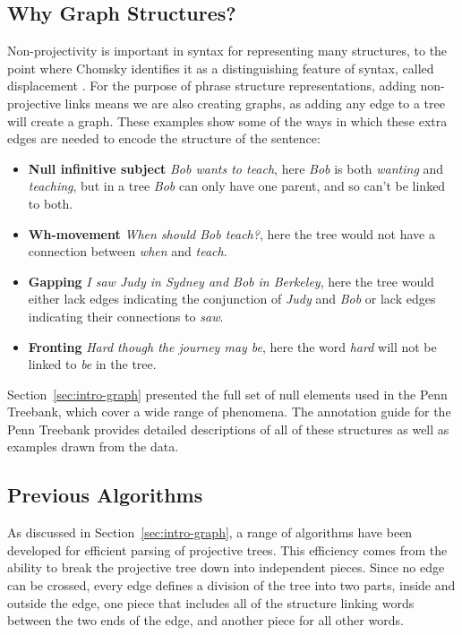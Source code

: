\subsection{Why Graph Structures?}

Non-projectivity is important in syntax for representing many structures, to the point where Chomsky identifies it as a distinguishing feature of syntax, called displacement \parencite{displacement}.
For the purpose of phrase structure representations, adding non-projective links means we are also creating graphs, as adding any edge to a tree will create a graph.
These examples show some of the ways in which these extra edges are needed to encode the structure of the sentence:

\begin{itemize}
  \item \textbf{Null infinitive subject} \emph{Bob wants to teach}, here \emph{Bob} is both \emph{wanting} and \emph{teaching}, but in a tree \emph{Bob} can only have one parent, and so can't be linked to both.
  \item \textbf{Wh-movement} \emph{When should Bob teach?}, here the tree would not have a connection between \emph{when} and \emph{teach}.
  \item \textbf{Gapping} \emph{I saw Judy in Sydney and Bob in Berkeley}, here the tree would either lack edges indicating the conjunction of \emph{Judy} and \emph{Bob} or lack edges indicating their connections to \emph{saw}.
  \item \textbf{Fronting} \emph{Hard though the journey may be}, here the word \emph{hard} will not be linked to \emph{be} in the tree.
\end{itemize}

Section~\ref{sec:intro-graph} presented the full set of null elements used in the Penn Treebank, which cover a wide range of phenomena.
The annotation guide for the Penn Treebank \parencite{ptb-guide} provides detailed descriptions of all of these structures as well as examples drawn from the data.

\subsection{Previous Algorithms}

As discussed in Section~\ref{sec:intro-graph}, a range of algorithms have been developed for efficient parsing of projective trees.
This efficiency comes from the ability to break the projective tree down into independent pieces.
Since no edge can be crossed, every edge defines a division of the tree into two parts, inside and outside the edge, \myie one piece that includes all of the structure linking words between the two ends of the edge, and another piece for all other words.


